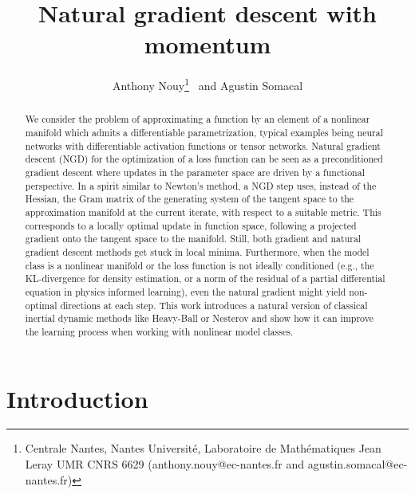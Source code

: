 \documentclass{article}
\title{Natural gradient descent with momentum}
\author{Anthony Nouy\thanks{Centrale  Nantes, Nantes Université,  Laboratoire de Mathématiques Jean Leray UMR CNRS 6629 (anthony.nouy@ec-nantes.fr and agustin.somacal@ec-nantes.fr)}~ and Agustin Somacal\samethanks[1]}
\date{}
\theoremstyle{noparens}
\begin{document}
\maketitle

\begin{abstract}
We consider the problem of approximating a function by an element of a nonlinear manifold which admits a differentiable parametrization, typical examples being neural networks with differentiable activation functions or tensor networks.
    Natural gradient descent (NGD) for the optimization of a loss function can be seen as a preconditioned gradient descent where updates in the parameter space are driven by a functional perspective. In a spirit similar to Newton’s method, a NGD step uses, instead of the Hessian, the Gram matrix of the generating system of the tangent space to the approximation manifold at the current iterate, with respect to a suitable metric. This corresponds to a locally optimal update in function space, following a projected gradient onto the tangent space to the manifold.
    Still, both gradient and natural gradient descent methods  get stuck in local minima. Furthermore, when the model class is a nonlinear manifold  or the loss function is not ideally conditioned (e.g., the KL-divergence for density estimation, or a  norm of the residual of a partial differential equation in physics informed learning), even the natural gradient might yield non-optimal directions at each step. This work introduces a natural version of classical inertial dynamic methods like Heavy-Ball or Nesterov and show how it can improve the  learning process when working with nonlinear model classes.
\end{abstract}

\section{Introduction}
\end{document}
